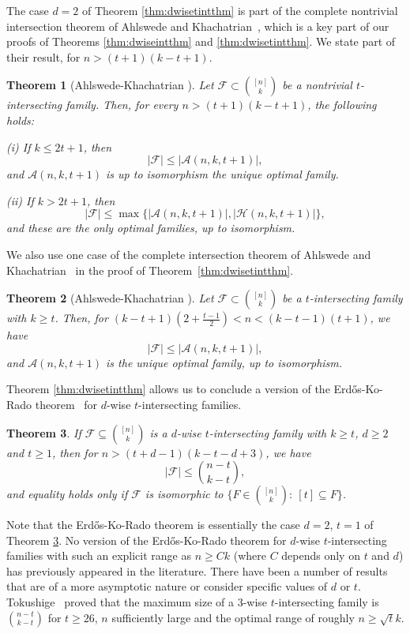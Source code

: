 \documentclass[12pt]{article}
\newtheorem{theorem}{Theorem}
\theoremstyle{definition}
\newcommand{\cH}{\mathcal{H}}
\newcommand{\cA}{\mathcal{A}}
\newcommand{\cF}{\mathcal{F}}
\begin{document}
The case $d=2$ of Theorem \ref{thm:dwisetintthm} is part of the complete nontrivial intersection theorem of Ahlswede and Khachatrian~\cite{AK2}, which is a key part of our proofs of Theorems \ref{thm:dwiseintthm} and \ref{thm:dwisetintthm}. We state part of their result, for $n > (t+1)(k-t+1)$. 

\begin{theorem}[Ahlswede-Khachatrian \cite{AK2}]\label{thm:akntcithm}
Let $\cF \subset \binom{[n]}{k}$ be a nontrivial $t$-intersecting family. Then, for every $n > (t+1)(k-t+1)$, the following holds:

(i) If $k\le 2t+1$, then \[|\cF| \le |\cA(n, k, t+1)|,\]
and $\cA(n, k, t+1)$ is up to isomorphism the unique optimal family. 

(ii) If $k > 2t+1$, then \[|\cF| \le \max\{|\cA(n, k, t+1)|, |\cH(n, k, t+1)|\},\]
and these are the only optimal families, up to isomorphism. 
\end{theorem}

We also use one case of the complete intersection theorem of Ahlswede and Khachatrian~\cite{AK1, AK3} in the proof of Theorem~\ref{thm:dwisetintthm}. 

\begin{theorem}[Ahlswede-Khachatrian \cite{AK1, AK3}]\label{thm:aktcithm}
Let $\cF \subset \binom{[n]}{k}$ be a $t$-intersecting family with $k\ge t$. Then, for $(k-t+1)(2+\frac{t-1}{2}) < n < (k-t-1)(t+1)$, we have 
\[|\cF| \le |\cA(n, k, t+1)|,\]
and $\cA(n, k, t+1)$ is the unique optimal family, up to isomorphism.
\end{theorem}

Theorem \ref{thm:dwisetintthm} allows us to conclude a version of the Erd\H{o}s-Ko-Rado theorem~\cite{EKR} for $d$-wise $t$-intersecting families.

\begin{theorem}\label{thm:ekrdwisetintthm}
If $\cF\subseteq \binom{[n]}{k}$ is a $d$-wise $t$-intersecting family with $k\ge t$, $d\ge 2$ and $t\ge 1$, then for $n > (t+d-1)(k-t-d+3)$, we have
\[|\cF| \le \binom{n-t}{k-t},\]
and equality holds only if $\cF$ is isomorphic to $\{F \in \binom{[n]}{k}:\ [t] \subseteq F\}$.
\end{theorem}

Note that the Erd\H{o}s-Ko-Rado theorem is essentially the case $d=2$, $t=1$ of Theorem \ref{thm:ekrdwisetintthm}. No version of the Erd\H{o}s-Ko-Rado theorem for $d$-wise $t$-intersecting families with such an explicit range as $n \ge Ck$ (where $C$ depends only on $t$ and $d$) has previously appeared in the literature.  There have been a number of results that are of a more asymptotic nature \cite{T} or consider specific values of $d$ or $t$. Tokushige~\cite{Tok3} proved that the maximum size of a $3$-wise $t$-intersecting family is $\binom{n-t}{k-t}$ for $t\ge 26$, $n$ sufficiently large and the optimal range of roughly $n\ge \sqrt{t}k$. 
\end{document}
